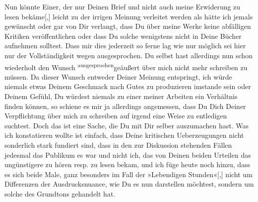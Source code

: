 \pstart
           Nun könnte Einer, der nur Deinen Brief und nicht {\pb}auch meine Erwiderung zu lesen
                  bekäme{[},{]} leicht zu der irrigen Meinung verleitet werden als
               hätte ich jemals gewünscht oder gar von Dir verlangt, dass Du über meine Werke keine
               abfälligen Kritiken \introOben{}veröffentlichen\introOben{} oder dass Du solche
               wenigstens nicht in Deine Bücher aufnehmen solltest. Dass mir
               dies jederzeit so ferne lag wie nur möglich sei hier nur der Vollständigkeit wegen
               ausgesprochen. Du selbst hast allerdings nun schon wiederholt den Wunsch \substVorne{}\textsuperscript{ausgesprochen}\substDazwischen{}geäußert\substHinten{} über mich nicht mehr schreiben zu müssen. Da dieser Wunsch entweder Deiner
               Meinung entspringt, ich würde niemals etwas Deinem Geschmack nach Gutes zu
               produzieren imstande sein oder Deinem Gefühl, Du würdest niemals zu einer meiner
               Arbeiten ein Verhältnis finden können, so schiene es mir ja allerdings angemessen,
               dass Du Dich Deiner Verpflichtung über mich zu schreiben \introOben{}auf
                  irgend eine Weise\introOben{} zu entledigen suchtest. Doch das ist eine Sache, die Du
               mit Dir selber auszumachen hast. Was ich konstatieren wollte ist einfach, dass Deine
               kritischen Ueberzeugungen nicht sonderlich stark fundiert sind, dass in den zur
               Diskussion stehenden Fällen jedesmal das Publikum es war und nicht ich, das von Deinen beiden Urteilen das
               ungünstigere zu hören resp. zu lesen bekam, und ich füge {\pb}heute noch hinzu, dass es sich beide Male, ganz
               besonders im Fall der »Lebendigen
                  Stunden«{[},{]} nicht um Differenzen der Ausdrucksnuance, wie
               Du es nun darstellen möchtest, sondern um solche des Grundtons gehandelt hat.\pend
           
